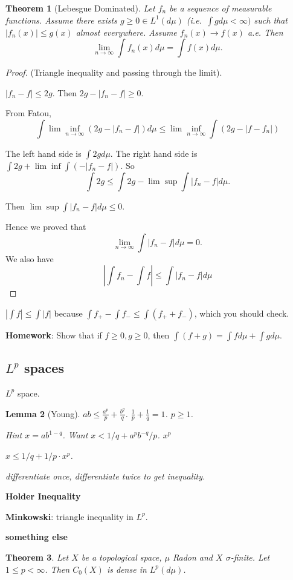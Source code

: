\documentclass[11pt]{article}
\newtheorem{thm}{Theorem}[section]
\newtheorem{lem}[thm]{Lemma}
\newenvironment{defn}[1][Definition]{\begin{trivlist}
\item[\hskip \labelsep {\bfseries #1}]}{\end{trivlist}}
\newcommand{\ra}{\rightarrow}
\newcommand{\si}{\sigma}
\newcommand{\fr}[2]{\frac{#1}{#2}}
\begin{document}
\begin{thm}[Lebesgue Dominated]
Let $f_n$ be a sequence of measurable functions. Assume there exists $g\ge 0\in L^1(d\mu)$ (i.e.\ $\int gd\mu<\infty)$ such that $|f_n(x)|\le g(x)$ almost everywhere. Assume $f_n(x)\ra f(x)$ a.e. Then \[\lim_{n\ra\infty}\int f_n(x)d\mu=\int f(x)d\mu.\]
\end{thm}
\begin{proof}
(Triangle inequality and passing through the limit). 

$|f_n-f|\le 2g$. Then $2g-|f_n-f|\ge 0$. 

From Fatou, \[\int\lim\inf_{n\ra\infty}(2g-|f_n-f|)d\mu\le\lim\inf_{n\ra\infty}\int(2g-|f-f_n|)\]

The left hand side is $\int 2gd\mu$. The right hand side is $\int 2g+\lim\inf\int(-|f_n-f|)$. So
\[\int 2g\le \int2g-\lim\sup\int|f_n-f|d\mu.\]

Then $\lim\sup\int|f_n-f|d\mu\le 0$. 

Hence we proved that \[\lim_{n\ra\infty}\int |f_n-f|d\mu=0.\] We also have \[\left|\int f_n-\int f\right|\le\int|f_n-f|d\mu\]
\end{proof}

$|\int f|\le \int |f|$ because $\int f_+-\int f_-\le \int( f_++f_-)$, which you should check.

{\bf Homework}: Show that if $f\ge 0, g\ge 0$, then $\int(f+g)=\int fd\mu+\int gd\mu$. 

\subsection{$L^p$ spaces}

\begin{defn} $L^p$ space.\end{defn}

\begin{lem}[Young]
$ab\le \fr{a^p}{p}+\fr{b^q}{q}$. $\fr{1}{p}+\fr{1}{q}=1$. $p\ge1$. 

Hint $x=ab^{1-q}$. Want $x<1/q+a^pb^{-q}/p$. $x^p$

$x\le 1/q+1/p\cdot x^p$. 

differentiate once, differentiate twice to get inequality. 
\end{lem}

{\bf Holder Inequality}


{\bf Minkowski}: triangle inequality in $L^p$. 

{\bf something else} 

\begin{thm}Let $X$ be a topological space, $\mu$ Radon and $X$ $\si$-finite. Let $1\le p<\infty$. Then $C_0(X)$ is dense in $L^p(d\mu)$. 
\end{thm}
\end{document}
